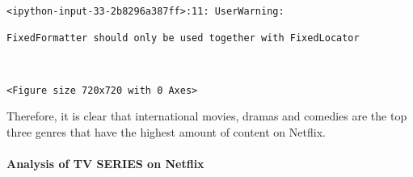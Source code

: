 \documentclass[11pt]{article}
\begin{document}
    \begin{Verbatim}[commandchars=\\\{\}]
<ipython-input-33-2b8296a387ff>:11: UserWarning:

FixedFormatter should only be used together with FixedLocator

    \end{Verbatim}

    \begin{center}
    \end{center}
    { \hspace*{\fill} \\}
    
    
    \begin{Verbatim}[commandchars=\\\{\}]
<Figure size 720x720 with 0 Axes>
    \end{Verbatim}

    
    Therefore, it is clear that international movies, dramas and comedies
are the top three genres that have the highest amount of content on
Netflix.

    \hypertarget{analysis-of-tv-series-on-netflix}{%
\paragraph{Analysis of TV SERIES on
Netflix}\label{analysis-of-tv-series-on-netflix}}
\end{document}
